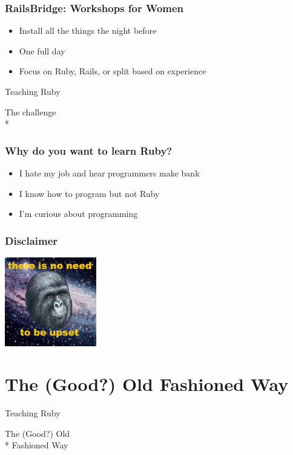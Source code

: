 \documentclass[20pt]{beamer}
\begin{document}
\begin{frame}
	\frametitle{RailsBridge: Workshops for Women}
	\begin{itemize}
		\item Install all the things the night before
		\item One full day
		\item Focus on Ruby, Rails, or split based on experience
	\end{itemize}
\end{frame}

\begin{frame}
	\par { Teaching Ruby}\par
	\vspace{3cm}\hfill
	{The challenge \\*}
\end{frame}

\begin{frame}
	\frametitle{Why do you want to learn Ruby?}
	\begin{itemize}
		\item I hate my job and hear programmers make bank
		\item I know how to program but not Ruby
		\item I'm curious about programming
	\end{itemize}
\end{frame}

\begin{frame}
	\frametitle{Disclaimer}
	\centering \includegraphics[width=4cm]{gorilla}\par
{
}
\end{frame}

\section{The (Good?) Old Fashioned Way}
\begin{frame}
	\par { Teaching Ruby}\par
	\vspace{3cm}\hfill
	{The (Good?) Old\\* \hfill Fashioned Way}
\end{frame}
\end{document}
